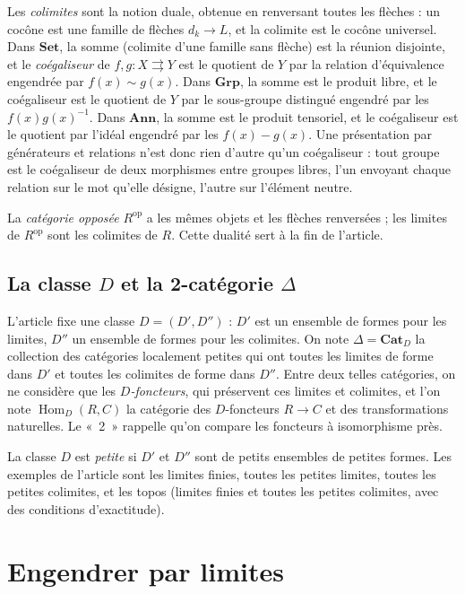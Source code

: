 \documentclass[11pt,a4paper]{amsart}
\theoremstyle{definition}
\theoremstyle{plain}
\theoremstyle{remark}
\newcommand{\Set}{\mathbf{Set}}
\newcommand{\Grp}{\mathbf{Grp}}
\newcommand{\Ann}{\mathbf{Ann}}
\newcommand{\Cat}{\mathbf{Cat}}
\newcommand{\Hom}{\operatorname{Hom}}
\begin{document}
Les \emph{colimites} sont la notion duale, obtenue en renversant toutes les flèches : un cocône est une famille de flèches $d_k\to L$, et la colimite est le cocône universel. Dans $\Set$, la somme (colimite d'une famille sans flèche) est la réunion disjointe, et le \emph{coégaliseur} de $f,g\colon X\rightrightarrows Y$ est le quotient de $Y$ par la relation d'équivalence engendrée par $f(x)\sim g(x)$. Dans $\Grp$, la somme est le produit libre, et le coégaliseur est le quotient de $Y$ par le sous-groupe distingué engendré par les $f(x)g(x)^{-1}$. Dans $\Ann$, la somme est le produit tensoriel, et le coégaliseur est le quotient par l'idéal engendré par les $f(x)-g(x)$. Une présentation par générateurs et relations n'est donc rien d'autre qu'un coégaliseur : tout groupe est le coégaliseur de deux morphismes entre groupes libres, l'un envoyant chaque relation sur le mot qu'elle désigne, l'autre sur l'élément neutre.

La \emph{catégorie opposée} $R^{\mathrm{op}}$ a les mêmes objets et les flèches renversées ; les limites de $R^{\mathrm{op}}$ sont les colimites de $R$. Cette dualité sert à la fin de l'article.

\subsection{La classe $D$ et la 2-catégorie $\Delta$}

L'article fixe une classe $D=(D',D'')$ : $D'$ est un ensemble de formes pour les limites, $D''$ un ensemble de formes pour les colimites. On note $\Delta=\Cat_D$ la collection des catégories localement petites qui ont toutes les limites de forme dans $D'$ et toutes les colimites de forme dans $D''$. Entre deux telles catégories, on ne considère que les \emph{$D$-foncteurs}, qui préservent ces limites et colimites, et l'on note $\Hom_D(R,C)$ la catégorie des $D$-foncteurs $R\to C$ et des transformations naturelles. Le «~2~» rappelle qu'on compare les foncteurs à isomorphisme près.

La classe $D$ est \emph{petite} si $D'$ et $D''$ sont de petits ensembles de petites formes. Les exemples de l'article sont les limites finies, toutes les petites limites, toutes les petites colimites, et les topos (limites finies et toutes les petites colimites, avec des conditions d'exactitude).

\section{Engendrer par limites}
\end{document}
